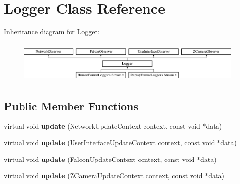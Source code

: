 \hypertarget{classLogger}{
\section{Logger Class Reference}
\label{classLogger}
}
Inheritance diagram for Logger:\begin{figure}[H]
\begin{center}
\leavevmode
\includegraphics[height=2.089552cm]{classLogger}
\end{center}
\end{figure}
\subsection*{Public Member Functions}
\begin{DoxyCompactItemize}
\item 
\hypertarget{classLogger_abb5098f19a132e91034a6974ed1f2e51}{
virtual void {\bfseries update} (NetworkUpdateContext context, const void $\ast$data)}
\label{classLogger_abb5098f19a132e91034a6974ed1f2e51}

\item 
\hypertarget{classLogger_ab346038a6b7f284d8f57d1296dd98079}{
virtual void {\bfseries update} (UserInterfaceUpdateContext context, const void $\ast$data)}
\label{classLogger_ab346038a6b7f284d8f57d1296dd98079}

\item 
\hypertarget{classLogger_afe25b23b7f952e183f1361ac572800c4}{
virtual void {\bfseries update} (FalconUpdateContext context, const void $\ast$data)}
\label{classLogger_afe25b23b7f952e183f1361ac572800c4}

\item 
\hypertarget{classLogger_a9ac2396edcab7a8ff751bc3bd5a1dd33}{
virtual void {\bfseries update} (ZCameraUpdateContext context, const void $\ast$data)}
\label{classLogger_a9ac2396edcab7a8ff751bc3bd5a1dd33}

\end{DoxyCompactItemize}
